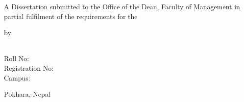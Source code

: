 \begin{titlepage}
\thispagestyle{empty}
\singlespacing
\setlength{\parskip}{0pt}
\begin{center}

\vspace*{-22.8pt}

{\thesisTitleFont \thesistitle\par}

\vspace{96.0pt}

{\titlePageBodyFont A Dissertation submitted to the Office of the Dean, Faculty of Management in partial fulfilment of the requirements for the \thesisdegree\par}

\vspace{104.0pt}

{\titlePageBodyFont by\par}

\vspace{103.8pt}

{\titlePageBodyFont \thesisauthor\\
Roll No: \thesisroll\\
Registration No: \thesisregistration\\
Campus: \thesiscampus\par}

\vspace{104.1pt}

{\titlePageBodyFont Pokhara, Nepal\\
\thesisdate\par}

\end{center}
\end{titlepage}

